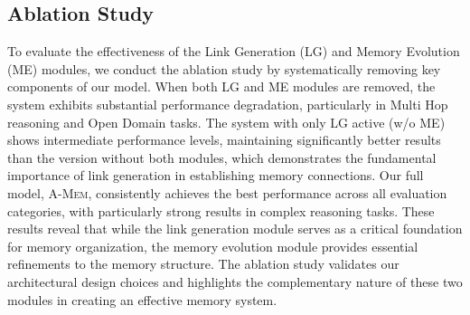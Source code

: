 \documentclass{article}
\newcommand{\ours}{\textsc{A-Mem}\xspace}
\begin{document}
\subsection{Ablation Study}
To evaluate the effectiveness of the Link Generation (LG) and Memory Evolution (ME) modules, we conduct the ablation study by systematically removing key components of our model. When both LG and ME modules are removed, the system exhibits substantial performance degradation, particularly in Multi Hop reasoning and Open Domain tasks. The system with only LG active (w/o ME) shows intermediate performance levels, maintaining significantly better results than the version without both modules, which demonstrates the fundamental importance of link generation in establishing memory connections. Our full model, \ours, consistently achieves the best performance across all evaluation categories, with particularly strong results in complex reasoning tasks. These results reveal that while the link generation module serves as a critical foundation for memory organization, the memory evolution module provides essential refinements to the memory structure. The ablation study validates our architectural design choices and highlights the complementary nature of these two modules in creating an effective memory system.
\end{document}
